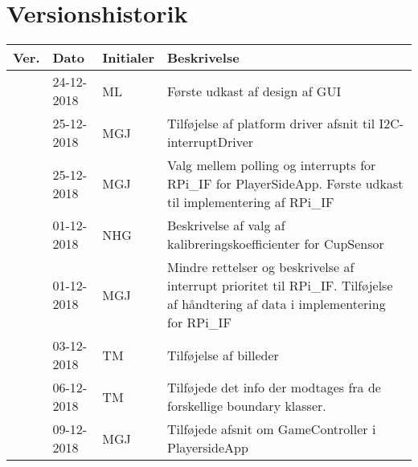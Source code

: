 \documentclass[Softwaredesign/Softwaredesign_main.tex]{subfiles}
\begin{document}
\section{Versionshistorik}
\begin{longtable}{|L{0.07\textwidth}|L{0.15\textwidth}|L{0.13\textwidth}|L{0.55\textwidth}|}
        \hline
        \textbf{Ver.} & \textbf{Dato} & \textbf{Initialer} & \textbf{Beskrivelse}  \\ \hline
         & 24-12-2018 & ML & Første udkast af design af GUI \\ \hline
         & 25-12-2018 & MGJ & Tilføjelse af platform driver afsnit til I2C-interruptDriver \\ \hline
         & 25-12-2018 & MGJ & Valg mellem polling og interrupts for RPi\_IF for PlayerSideApp. Første udkast til implementering  af RPi\_IF \\ \hline
         & 01-12-2018 & NHG & Beskrivelse af valg af kalibreringskoefficienter for CupSensor \\ \hline 
         & 01-12-2018 & MGJ & Mindre rettelser og beskrivelse af interrupt prioritet til RPi\_IF. Tilføjelse af håndtering af data i implementering for RPi\_IF \\ \hline
         & 03-12-2018 & TM & Tilføjelse af billeder \\ \hline
         & 06-12-2018 & TM & Tilføjede det info der modtages fra de forskellige boundary klasser. \\ \hline
         & 09-12-2018 & MGJ & Tilføjede afsnit om GameController i PlayersideApp \\ \hline
\end{longtable}
\end{document}
